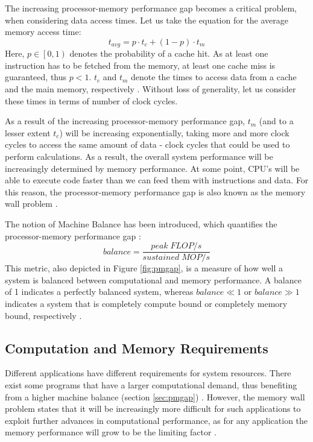 The increasing processor-memory performance gap becomes a critical problem, when considering data access times. Let us take the equation for the average memory access time:
\begin{equation}\label{eq:avg_mem_time}
t_{avg} = p \cdot t_c + (1-p) \cdot t_m
\end{equation}
Here, $p \in \left[0,1\right)$ denotes the probability of a cache hit. As at least one instruction has to be fetched from the memory, at least one cache miss is guaranteed, thus $p < 1$. $t_c$ and $t_m$ denote the times to access data from a cache and the main memory, respectively \cite{wulf1995hitting, mahapatra1999processor}. Without loss of generality, let us consider these times in terms of number of clock cycles.

As a result of the increasing processor-memory performance gap, $t_m$ (and to a lesser extent $t_c$) will be increasing exponentially, taking more and more clock cycles to access the same amount of data - clock cycles that could be used to perform calculations. As a result, the overall system performance will be increasingly determined by memory performance. At some point, CPU's will be able to execute code faster than we can feed them with instructions and data. For this reason, the processor-memory performance gap is also known as the memory wall problem \cite{wulf1995hitting, mckee2004reflections, mahapatra1999processor}.

The notion of Machine Balance has been introduced, which quantifies the processor-memory performance gap \cite{mccalpin1997survey, mccalpin2016memory}:
\begin{equation}\label{eq:machine_balance}
	balance = \frac{peak\; FLOP/s}{sustained\; MOP/s}
\end{equation}
This metric, also depicted in Figure \ref{fig:pmgap}, is a measure of how well a system is balanced between computational and memory performance. A balance of 1 indicates a perfectly balanced system, whereas $balance \ll 1$ or $balance \gg 1$  indicates a system that is completely compute bound or completely memory bound, respectively \cite{mccalpin1997survey, mccalpin2016memory}.

\subsection{Computation and Memory Requirements}\label{sec:comp_mem_req}
Different applications have different requirements for system resources. There exist some programs that have a larger computational demand, thus benefiting from a higher machine balance (section \ref{sec:pmgap}) \cite{mccalpin2016memory}. However, the memory wall problem states that it will be increasingly more difficult for such applications to exploit further advances in computational performance, as for any application the memory performance will grow to be the limiting factor \cite{wulf1995hitting, mckee2004reflections}.

